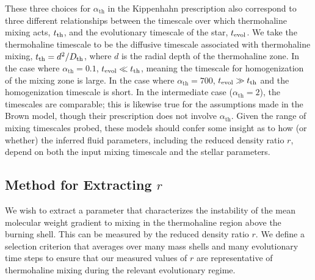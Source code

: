 These three choices for $\alpha_{\text{th}}$ in the Kippenhahn prescription also correspond to three different relationships between the timescale over which thermohaline mixing acts, $t_{\rm th}$, and the evolutionary timescale of the star, $t_{\rm{evol}}$. 
We take the thermohaline timescale to be the diffusive timescale associated with thermohaline mixing, $t_{\rm th} = d^2/D_{\rm th}$, where $d$ is the radial depth of the thermohaline zone.
In the case where $\alpha_{\text{th}} = 0.1$, 
$t_{\rm evol} \ll t_{\rm th}$, meaning the timescale for homogenization of the mixing zone is large. In the case where $\alpha_{\text{th}} = 700$, 
$t_{\rm evol} \gg t_{\rm th}$ and the homogenization timescale is short. In the intermediate case ($\alpha_{\text{th}}= 2$), the timescales are comparable; this is likewise true for the assumptions made in the Brown model, though their prescription does not involve $\alpha_{\text{th}}$. 
%
Given the range of mixing timescales probed, these models should confer some insight as to how (or whether) the inferred fluid parameters, including the reduced density ratio $r$, depend on both the input mixing timescale and the stellar parameters.


\subsection{Method for Extracting $r$}
%
We wish to extract a parameter that characterizes the instability of the mean molecular weight gradient to mixing in the thermohaline region above the burning shell. This can be measured by the reduced density ratio $r$.
We define a selection criterion that averages over many mass shells and many evolutionary time steps to ensure that our measured values of $r$ are representative of thermohaline mixing during the relevant evolutionary regime.

